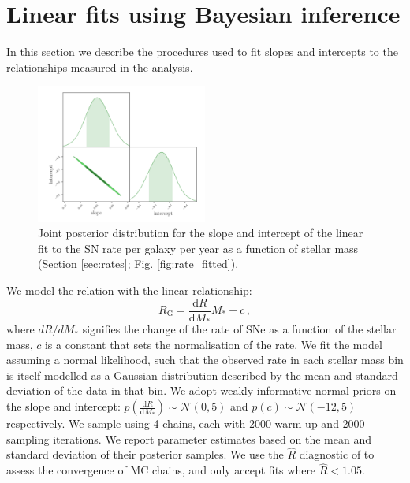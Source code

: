 \documentclass[fleqn,usenatbib]{mnras}
\begin{document}


\appendix

\section{Linear fits using Bayesian inference}
In this section we describe the procedures used to fit slopes and intercepts to the relationships measured in the analysis.

\label{appendix:linear_fits}

\begin{figure}
    \centering
    \includegraphics[width=0.5\textwidth]{figs/fit_fine_BC03_corner.pdf}
    \caption{Joint posterior distribution for the slope and intercept of the linear fit to the SN rate per galaxy per year as a function of stellar mass (Section \ref{sec:rates}; Fig. \ref{fig:rate_fitted}).}
    \label{fig:corner_slope_int}
\end{figure}

We model the relation with the linear relationship: 
\begin{equation}
    R_{\mathrm{G}} = \frac{\mathrm{d}R}{\mathrm{d}M_*} M_* + c \,,
\label{eq:rate_fit}
\end{equation}
where $dR/dM_*$ signifies the change of the rate of SNe as a function of the stellar mass, $c$ is a constant that sets the normalisation of the rate. We fit the model assuming a normal likelihood, such that the observed rate in each stellar mass bin is itself modelled as a Gaussian distribution described by the mean and standard deviation of the data in that bin. We adopt weakly informative normal priors on the slope and intercept: $p\left(\frac{\mathrm{d}R}{\mathrm{d}M_*}\right) \sim \mathcal{N}\left(0,5\right)$ and  $p\left(c\right) \sim \mathcal{N}\left(-12,5\right)$ respectively. We sample using 4 chains, each with 2000 warm up and 2000 sampling iterations. We report parameter estimates based on the mean and standard deviation of their posterior samples. We use the $\hat{R}$ diagnostic of \citep{Vehtari2019} to assess the convergence of MC chains, and only accept fits where $\hat{R}<1.05$.
\end{document}

